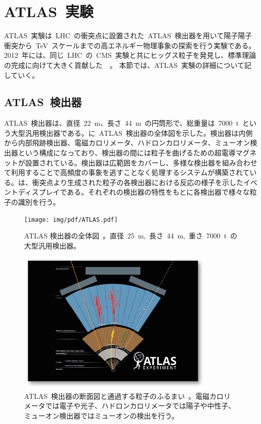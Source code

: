 \section{ATLAS~実験}
ATLAS~実験は~LHC~の衝突点に設置された~ATLAS~検出器を用いて陽子陽子衝突から~TeV~スケールまでの高エネルギー物理事象の探索を行う実験である。2012~年には、同じ~LHC~の~CMS~実験と共にヒッグス粒子を発見し、標準理論の完成に向けて大きく貢献した~\cite{TR:03}~\cite{TR:03a}。
本節では、ATLAS~実験の詳細について記していく。
\subsection{ATLAS~検出器}
ATLAS~検出器は、直径~22~m、長さ~44~m~の円筒形で、総重量は~7000~t~という大型汎用検出器である。に~ATLAS~検出器の全体図を示した。検出器は内側から内部飛跡検出器、電磁カロリメータ、ハドロンカロリメータ、ミューオン検出器という構成になっており、検出器の間には粒子を曲げるための超電導マグネットが設置されている。検出器は広範囲をカバーし、多様な検出器を組み合わせて利用することで高頻度の事象を逃すことなく処理するシステムが構築されている。は、衝突点より生成された粒子の各検出器における反応の様子を示したイベントディスプレイである。それぞれの検出器の特性をもとに各検出器で様々な粒子の識別を行う。

\begin{figure}[H]
    \centering   
    \texttt{[image: img/pdf/ATLAS.pdf]}
    \caption[ATLAS 検出器の全体図]{ATLAS 検出器の全体図~\cite{TR:01}。直径~25~m,~長さ~44~m,~重さ~7000~t~の大型汎用検出器。}\label{fig:atlasdet}
\end{figure}

\begin{figure}[htbp]
    \centering   
    \includegraphics[width=0.85\textwidth]{img/jpeg/how.png}
    \caption[ATLAS~検出器の断面図と通過する粒子のふるまい]{ATLAS~検出器の断面図と通過する粒子のふるまい~\cite{URL:02}。電磁カロリメータでは電子や光子、ハドロンカロリメータでは陽子や中性子、ミューオン検出器ではミューオンの検出を行う。}
    \label{fig:disp}
\end{figure}

